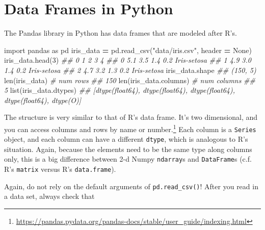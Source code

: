\documentclass[
  12pt,
]{krantz}
\makeatletter
\newenvironment{Shaded}{\begin{snugshade}}{\end{snugshade}}
\newcommand{\BuiltInTok}[1]{#1}
\newcommand{\CommentTok}[1]{\textcolor[rgb]{0.37,0.37,0.37}{\textit{#1}}}
\newcommand{\DecValTok}[1]{\textcolor[rgb]{0.06,0.06,0.06}{#1}}
\newcommand{\ImportTok}[1]{#1}
\newcommand{\NormalTok}[1]{#1}
\newcommand{\OperatorTok}[1]{\textcolor[rgb]{0.43,0.43,0.43}{\textbf{#1}}}
\newcommand{\StringTok}[1]{\textcolor[rgb]{0.5,0.5,0.5}{#1}}
\newcommand{\VariableTok}[1]{\textcolor[rgb]{0,0,0}{#1}}
\renewcommand{\href}[2]{#2\footnote{\url{#1}}}
\newenvironment{kframe}{%
\medskip{}
\setlength{\fboxsep}{.8em}
 \def\at@end@of@kframe{}%
 \ifinner\ifhmode%
  \def\at@end@of@kframe{\end{minipage}}%
  \begin{minipage}{\columnwidth}%
 \fi\fi%
 \def\FrameCommand##1{\hskip\@totalleftmargin \hskip-\fboxsep
 \colorbox{shadecolor}{##1}\hskip-\fboxsep
     \hskip-\linewidth \hskip-\@totalleftmargin \hskip\columnwidth}%
 \MakeFramed {\advance\hsize-\width
   \@totalleftmargin\z@ \linewidth\hsize
   \@setminipage}}%
 {\par\unskip\endMakeFramed%
 \at@end@of@kframe}
\renewenvironment{Shaded}{\begin{kframe}}{\end{kframe}}
\makeatother
\begin{document}
\hypertarget{data-frames-in-python}{%
\section{Data Frames in Python}\label{data-frames-in-python}}

The Pandas library in Python has data frames that are modeled after R's.

\begin{Shaded}
\begin{Highlighting}[]
\ImportTok{import}\NormalTok{ pandas }\ImportTok{as}\NormalTok{ pd}
\NormalTok{iris\_data }\OperatorTok{=}\NormalTok{ pd.read\_csv(}\StringTok{"data/iris.csv"}\NormalTok{, header }\OperatorTok{=} \VariableTok{None}\NormalTok{)}
\NormalTok{iris\_data.head(}\DecValTok{3}\NormalTok{)}
\CommentTok{\#\#      0    1    2    3            4}
\CommentTok{\#\# 0  5.1  3.5  1.4  0.2  Iris{-}setosa}
\CommentTok{\#\# 1  4.9  3.0  1.4  0.2  Iris{-}setosa}
\CommentTok{\#\# 2  4.7  3.2  1.3  0.2  Iris{-}setosa}
\NormalTok{iris\_data.shape}
\CommentTok{\#\# (150, 5)}
\BuiltInTok{len}\NormalTok{(iris\_data) }\CommentTok{\# num rows}
\CommentTok{\#\# 150}
\BuiltInTok{len}\NormalTok{(iris\_data.columns) }\CommentTok{\# num columns}
\CommentTok{\#\# 5}
\BuiltInTok{list}\NormalTok{(iris\_data.dtypes)}
\CommentTok{\#\# [dtype(\textquotesingle{}float64\textquotesingle{}), dtype(\textquotesingle{}float64\textquotesingle{}), dtype(\textquotesingle{}float64\textquotesingle{}), dtype(\textquotesingle{}float64\textquotesingle{}), dtype(\textquotesingle{}O\textquotesingle{})]}
\end{Highlighting}
\end{Shaded}

The structure is very similar to that of R's data frame. It's two dimensional, and you can \href{https://pandas.pydata.org/pandas-docs/stable/user_guide/indexing.html}{access columns and rows by name or number.} Each column is a \texttt{Series} object, and each column can have a different \texttt{dtype}, which is analogous to R's situation. Again, because the elements need to be the same type along columns only, this is a big difference between 2-d Numpy \texttt{ndarray}s and \texttt{DataFrame}s (c.f. R's \texttt{matrix} versus R's \texttt{data.frame}).

Again, do not rely on the default arguments of \texttt{pd.read\_csv()}! After you read in a data set, always check that
\end{document}
